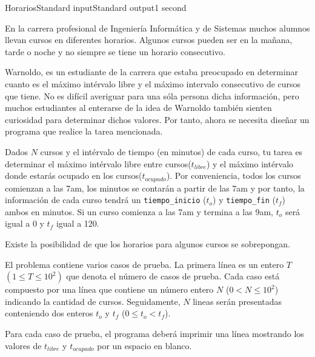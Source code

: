 \begin{problem}{Horarios}{Standard input}{Standard output}{1 second}{}


En la carrera profesional de Ingeniería Informática y de Sistemas muchos alumnos llevan cursos en diferentes horarios. Algunos cursos pueden ser en la mañana, tarde o noche y no siempre se tiene un horario consecutivo.

Warnoldo, es un estudiante de la carrera que estaba preocupado en determinar cuanto es el máximo intérvalo libre y el máximo intervalo consecutivo de cursos que tiene. No es difícil averiguar para una sóla persona dicha información, pero muchos estudiantes al enterarse de la idea de Warnoldo también sienten curiosidad para determinar dichos valores. Por tanto, ahora se necesita diseñar un programa que realice la tarea mencionada.

Dados $N$ cursos y el intérvalo de tiempo (en minutos) de cada curso, tu tarea es determinar el máximo intérvalo libre entre cursos($t_{libre}$) y el máximo intérvalo donde estarás ocupado en los cursos($t_{ocupado}$). Por conveniencia, todos los cursos comienzan a las 7am, los minutos se contarán a partir de las 7am y por tanto, la información de cada curso tendrá un \texttt{tiempo\_inicio} ($t_o$) y \texttt{tiempo\_fin} ($t_f$) ambos en minutos. Si un curso comienza a las 7am y termina a las 9am, $t_o$ será igual a 0 y $t_f$ igual a 120.  

Existe la posibilidad de que los horarios para algunos cursos se sobrepongan.

\InputFile
El problema contiene varios casos de prueba. La primera l\'inea es un entero $T$ $(1\leq T \leq 10^2)$ que denota el número de casos de prueba. Cada caso está compuesto por una l\'inea que contiene un número entero $N$ ($0<N\leq 10^2$) indicando la cantidad de cursos. Seguidamente, $N$ lineas serán presentadas conteniendo dos enteros $t_o$ y $t_f$ ($0 \leq t_o < t_f$).

\OutputFile
Para cada caso de prueba, el programa deber\'a imprimir una línea mostrando los valores de $t_{libre}$ y $t_{ocupado}$ por un espacio en blanco.

\Example

\begin{example}
\end{example}

\end{problem}

